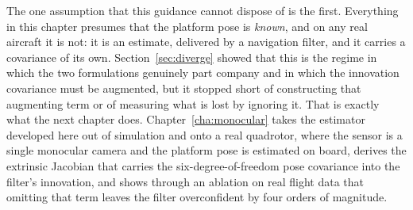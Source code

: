 The one assumption that this guidance cannot dispose of is the first. Everything
in this chapter presumes that the platform pose is \emph{known}, and on any real
aircraft it is not: it is an estimate, delivered by a navigation filter, and it
carries a covariance of its own. Section~\ref{sec:diverge} showed that this is the
regime in which the two formulations genuinely part company and in which the
innovation covariance must be augmented, but it stopped short of constructing that
augmenting term or of measuring what is lost by ignoring it. That is exactly what
the next chapter does. Chapter~\ref{cha:monocular} takes the estimator developed
here out of simulation and onto a real quadrotor, where the sensor is a single
monocular camera and the platform pose is estimated on board, derives the
extrinsic Jacobian that carries the six-degree-of-freedom pose covariance into the
filter's innovation, and shows through an ablation on real flight data that
omitting that term leaves the filter overconfident by four orders of magnitude.
